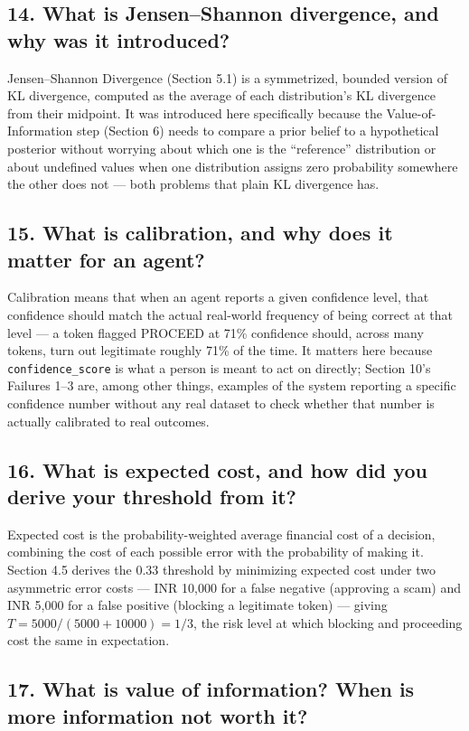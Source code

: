 \documentclass[11pt]{article}
\begin{document}
\subsection*{14. What is Jensen--Shannon divergence, and why was it introduced?}

Jensen--Shannon Divergence (Section 5.1) is a symmetrized, bounded version of KL divergence, computed as the average of each distribution's KL divergence from their midpoint. It was introduced here specifically because the Value-of-Information step (Section 6) needs to compare a prior belief to a hypothetical posterior without worrying about which one is the ``reference'' distribution or about undefined values when one distribution assigns zero probability somewhere the other does not --- both problems that plain KL divergence has.

\subsection*{15. What is calibration, and why does it matter for an agent?}

Calibration means that when an agent reports a given confidence level, that confidence should match the actual real-world frequency of being correct at that level --- a token flagged PROCEED at 71\% confidence should, across many tokens, turn out legitimate roughly 71\% of the time. It matters here because \texttt{confidence\_score} is what a person is meant to act on directly; Section 10's Failures 1--3 are, among other things, examples of the system reporting a specific confidence number without any real dataset to check whether that number is actually calibrated to real outcomes.

\subsection*{16. What is expected cost, and how did you derive your threshold from it?}

Expected cost is the probability-weighted average financial cost of a decision, combining the cost of each possible error with the probability of making it. Section 4.5 derives the 0.33 threshold by minimizing expected cost under two asymmetric error costs --- INR 10,000 for a false negative (approving a scam) and INR 5,000 for a false positive (blocking a legitimate token) --- giving $T=5000/(5000+10000)=1/3$, the risk level at which blocking and proceeding cost the same in expectation.

\subsection*{17. What is value of information? When is more information not worth it?}
\end{document}
